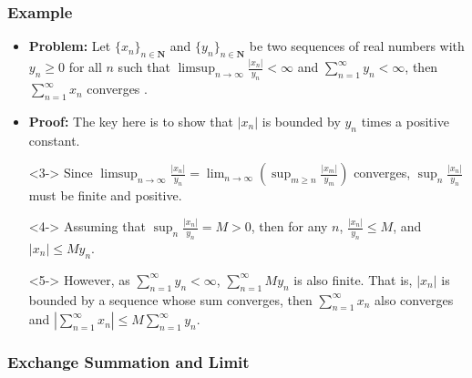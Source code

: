 \documentclass[handout]{beamer}
\begin{document}
\frame
{
  \frametitle{Example}

   \begin{itemize}
  \item <1-> \textbf{Problem:}  Let $\{x_{n}\}_{n\in \mathbf{N}}$ and $\{y_{n}\}_{n\in \mathbf{N}}$ be two sequences of real numbers with $y_n\geq 0$ for all $n$ such that $\limsup_{n\rightarrow \infty} \frac{|x_n|}{y_n} <\infty$ and $\sum_{n=1}^{\infty} y_n<\infty$, then  $\sum_{n=1}^{\infty} x_n$ converges .
  
   \item<2-> \textbf{Proof:}  The key here is to show that $|x_n|$ is bounded by $y_n$ times a positive constant. 
   \item[]<3-> Since  $\limsup_{n\rightarrow \infty} \frac{|x_n|}{y_n}=\lim_{n\rightarrow \infty} (\sup_{m\geq n} \frac{|x_m|}{y_m} )$ converges, $\sup_{ n} \frac{|x_n|}{y_n}$ must be finite and positive. 
      \item[]<4-> Assuming that $\sup_{ n} \frac{|x_n|}{y_n}=M>0$, then for any $n$, $\frac{|x_n|}{y_n}\leq M$, and $|x_n|\leq M y_n$. 

      \item[]<5-> However, as $\sum_{n=1}^{\infty} y_n<\infty$, $\sum_{n=1}^{\infty} M y_n$ is also finite. That is, $|x_n|$ is bounded by a sequence whose sum converges, then $\sum_{n=1}^{\infty} x_n$ also converges and $|\sum_{n=1}^{\infty} x_n|\leq M \sum_{n=1}^{\infty}  y_n$.   
         
       
  \end{itemize}
}




\subsubsection{Exchange Summation and Limit}
\end{document}
